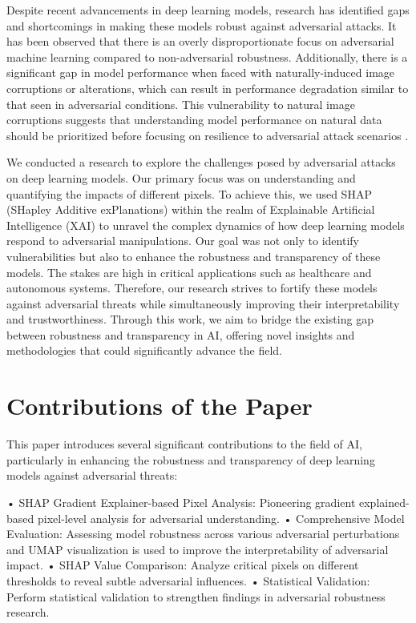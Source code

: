 \documentclass[10pt, conference, a4paper, final]{IEEEtran}
\begin{document}
Despite recent advancements in deep learning models, research has identified gaps and shortcomings in making these models robust against adversarial attacks. It has been observed that there is an overly disproportionate focus on adversarial machine learning compared to non-adversarial robustness. Additionally, there is a significant gap in model performance when faced with naturally-induced image corruptions or alterations, which can result in performance degradation similar to that seen in adversarial conditions. This vulnerability to natural image corruptions suggests that understanding model performance on natural data should be prioritized before focusing on resilience to adversarial attack scenarios \cite {Numair, Tianhang, Wei}. 

We conducted a research to explore the challenges posed by adversarial attacks on deep learning models. Our primary focus was on understanding and quantifying the impacts of different pixels. To achieve this, we used SHAP (SHapley Additive exPlanations) within the realm of Explainable Artificial Intelligence (XAI) to unravel the complex dynamics of how deep learning models respond to adversarial manipulations. Our goal was not only to identify vulnerabilities but also to enhance the robustness and transparency of these models. The stakes are high in critical applications such as healthcare and autonomous systems. Therefore, our research strives to fortify these models against adversarial threats while simultaneously improving their interpretability and trustworthiness. Through this work, we aim to bridge the existing gap between robustness and transparency in AI, offering novel insights and methodologies that could significantly advance the field.

\section{Contributions of the Paper}

This paper introduces several significant contributions to the field of AI, particularly in enhancing the robustness and transparency of deep learning models against adversarial threats:

•	SHAP Gradient Explainer-based Pixel Analysis: Pioneering gradient explained-based pixel-level analysis for adversarial understanding.
•	Comprehensive Model Evaluation: Assessing model robustness across various adversarial perturbations and UMAP visualization is used to improve the interpretability of adversarial impact.
•	SHAP Value Comparison:  Analyze critical pixels on different thresholds to reveal subtle adversarial influences.
•	Statistical Validation: Perform statistical validation to strengthen findings in adversarial robustness research.
\end{document}

